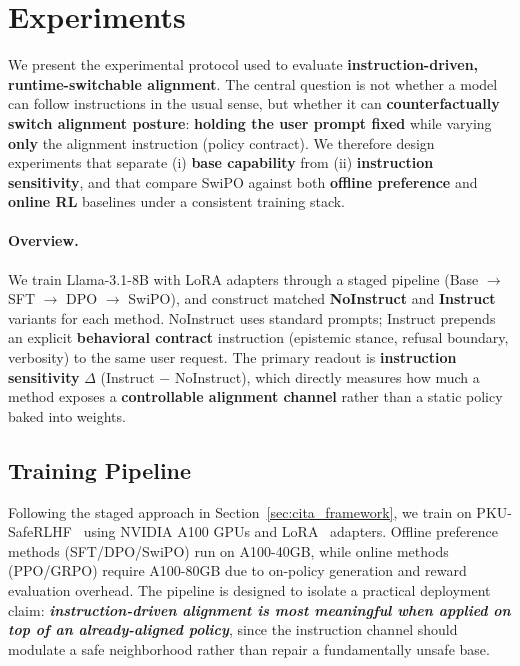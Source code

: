 \section{Experiments}
\label{sec:experiments}

We present the experimental protocol used to evaluate \textbf{instruction-driven, runtime-switchable alignment}.
The central question is not whether a model can follow instructions in the usual sense, but whether it can \textbf{counterfactually switch alignment posture}:
\textbf{holding the user prompt fixed} while varying \textbf{only} the alignment instruction (policy contract).
We therefore design experiments that separate (i) \textbf{base capability} from (ii) \textbf{instruction sensitivity}, and that compare SwiPO against both \textbf{offline preference} and \textbf{online RL} baselines under a consistent training stack.

\vspace{-0.2em}
\paragraph{\textbf{Overview.}}
We train Llama-3.1-8B with LoRA adapters through a staged pipeline (Base $\rightarrow$ SFT $\rightarrow$ DPO $\rightarrow$ SwiPO), and construct matched \textbf{NoInstruct} and \textbf{Instruct} variants for each method.
NoInstruct uses standard prompts; Instruct prepends an explicit \textbf{behavioral contract} instruction (epistemic stance, refusal boundary, verbosity) to the same user request.
The primary readout is \textbf{instruction sensitivity} $\Delta$ (Instruct $-$ NoInstruct), which directly measures how much a method exposes a \textbf{controllable alignment channel} rather than a static policy baked into weights.

\vspace{-1mm}
\subsection{Training Pipeline}
\label{sec:appendix_training_pipeline_exp}

Following the staged approach in Section~\ref{sec:cita_framework}, we train on PKU-SafeRLHF~\cite{ji2024pku,bai2022training} using NVIDIA A100 GPUs and LoRA~\cite{hu2022lora} adapters.
Offline preference methods (SFT/DPO/SwiPO) run on A100-40GB, while online methods (PPO/GRPO) require A100-80GB due to on-policy generation and reward evaluation overhead.
The pipeline is designed to isolate a practical deployment claim:
\textbf{\emph{instruction-driven alignment is most meaningful when applied on top of an already-aligned policy}}, since the instruction channel should modulate a safe neighborhood rather than repair a fundamentally unsafe base.

